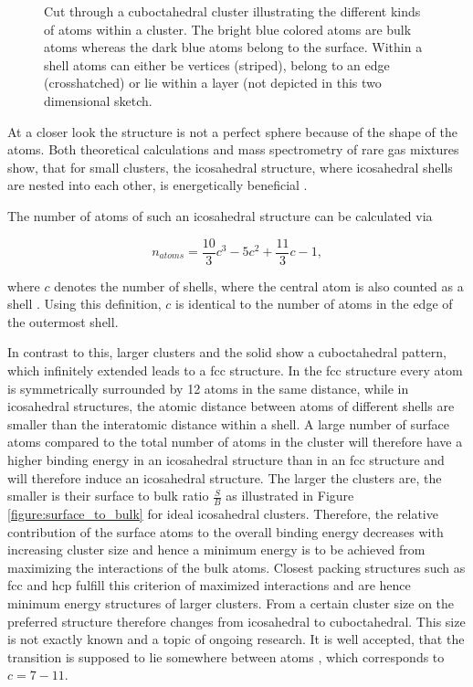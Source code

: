 \begin{figure}[h]
 \centering
 
 \caption{Cut through a cuboctahedral cluster illustrating the different
          kinds of atoms within a cluster. The bright blue colored atoms
          are bulk atoms whereas the dark blue atoms belong to the surface.
          Within a shell atoms can either be vertices (striped), belong to
          an edge (crosshatched) or lie within a layer (not depicted in this
          two dimensional sketch.}
 \label{figure:cluster_cut}
\end{figure}


At a closer look the structure is not a perfect sphere
because of the shape of the atoms.
Both theoretical
calculations and mass spectrometry of rare gas mixtures show, that
for small clusters, the icosahedral structure, where icosahedral
shells are nested into each other, is energetically beneficial
\cite{Echt81,Mackay62,Bjorneholm09,Martin96}.

The number of atoms of such an icosahedral structure can be calculated via

\begin{equation}
  n_{atoms} = \frac{10}{3} c^3 - 5 c^2 + \frac{11}{3} c -1 ,
\end{equation}

where $c$ denotes the number of shells, where the central atom is
also counted as a shell \cite{Martin96}. Using this definition, $c$ is
identical to the number of atoms
in the edge of the outermost shell.


In contrast to this, larger clusters and the solid show a cuboctahedral
pattern, which infinitely extended leads to a \ac{fcc} structure.
In the \ac{fcc} structure every atom is symmetrically surrounded
by 12 atoms in the same distance, while in icosahedral structures, the
atomic distance between atoms of different shells are smaller than the
interatomic distance within a shell. A large number of surface atoms
compared to the total number of atoms in the cluster will therefore have a
higher binding energy in an icosahedral structure than in an \ac{fcc} structure
and will therefore induce an icosahedral structure.
The larger the clusters are, the smaller is their surface to bulk
ratio $\frac{S}{B}$ as illustrated in                 
Figure \ref{figure:surface_to_bulk} for ideal icosahedral clusters.
Therefore, the relative contribution
of the surface atoms to the overall binding energy decreases with increasing
cluster size and hence a minimum energy is to be achieved from maximizing
the interactions of the bulk atoms. Closest packing structures such as
\ac{fcc} and \ac{hcp} fulfill this criterion of maximized interactions and
are hence minimum energy structures of larger clusters. From a certain cluster size on the
preferred structure therefore changes from icosahedral to cuboctahedral. This size
is not exactly known and a topic of ongoing research. It is well accepted,
that the transition is supposed to lie somewhere between \unit[800--3000]{atoms}
\cite{Hartke02,Pahl08}, which corresponds to $c = 7 - 11$.

